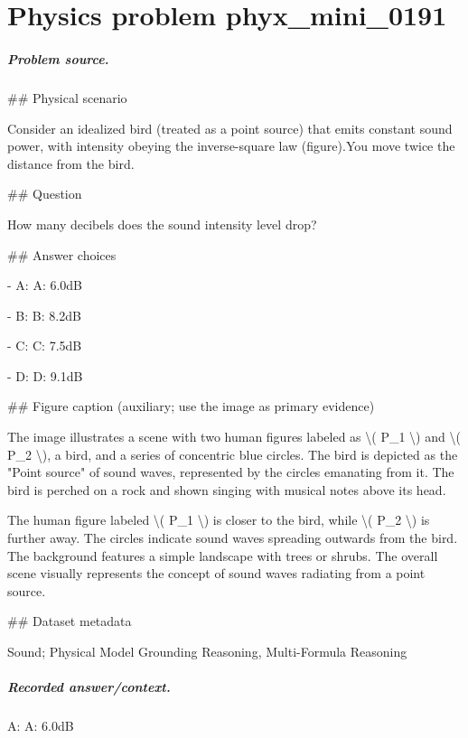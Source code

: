 
\chapter{Physics problem phyx\_mini\_0191}
\label{ch:PhyXMiniProblems_problem_phyx_mini_0191}

\paragraph{Problem source.}
\#\# Physical scenario

Consider an idealized bird (treated as a point source) that emits constant sound power, with intensity obeying the inverse-square law (figure).You move twice the distance from the bird.

\#\# Question

How many decibels does the sound intensity level drop?

\#\# Answer choices

- A: A: 6.0dB

- B: B: 8.2dB

- C: C: 7.5dB

- D: D: 9.1dB

\#\# Figure caption (auxiliary; use the image as primary evidence)

The image illustrates a scene with two human figures labeled as \textbackslash{}( P\_1 \textbackslash{}) and \textbackslash{}( P\_2 \textbackslash{}), a bird, and a series of concentric blue circles. The bird is depicted as the "Point source" of sound waves, represented by the circles emanating from it. The bird is perched on a rock and shown singing with musical notes above its head.

The human figure labeled \textbackslash{}( P\_1 \textbackslash{}) is closer to the bird, while \textbackslash{}( P\_2 \textbackslash{}) is further away. The circles indicate sound waves spreading outwards from the bird. The background features a simple landscape with trees or shrubs. The overall scene visually represents the concept of sound waves radiating from a point source.

\#\# Dataset metadata

Sound; Physical Model Grounding Reasoning, Multi-Formula Reasoning

\paragraph{Recorded answer/context.}
A: A: 6.0dB

